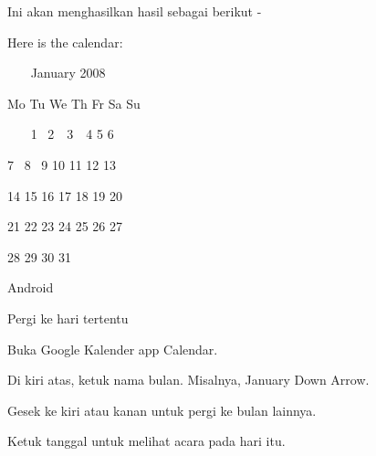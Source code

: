\vspace{12pt}
\vspace{12pt}
\vspace{12pt}
\vspace{12pt}
\vspace{12pt}
\vspace{12pt}
\noindent 
Ini akan menghasilkan hasil sebagai berikut - \par
\noindent 
 \hspace*{0.5in} Here is the calendar: \par
\noindent 
~~~  \hspace*{0.5in}  \hspace*{0.5in} January 2008 \par
\noindent 
 \hspace*{0.5in} Mo Tu We Th Fr Sa Su \par
\noindent 
~~~  \hspace*{0.5in}  \hspace*{0.5in} 1~ 2~~3~~4  5  6 \par
\noindent 
  \hspace*{0.5in}  \hspace*{0.5in} 7~ 8~ 9 10 11 12 13 \par
\noindent 
 \hspace*{0.5in}  \hspace*{0.5in} 14 15 16 17 18 19 20 \par
\noindent 
 \hspace*{0.5in}  \hspace*{0.5in} 21 22 23 24 25 26 27 \par
\noindent 
 \hspace*{0.5in}  \hspace*{0.5in} 28 29 30 31 \par
\vspace{12pt}
\vspace{12pt}
\noindent 
 \hspace*{0.5in} {\fontsize{16pt}{16pt}\selectfont Android \\} \par
\vspace{12pt}
\noindent 
Pergi ke hari tertentu \par
\noindent 
Buka Google Kalender app Calendar. \par
\noindent 
Di kiri atas, ketuk nama bulan. Misalnya, January Down Arrow. \par
\noindent 
Gesek ke kiri atau kanan untuk pergi ke bulan lainnya. \par
\noindent 
Ketuk tanggal untuk melihat acara pada hari itu. \par
